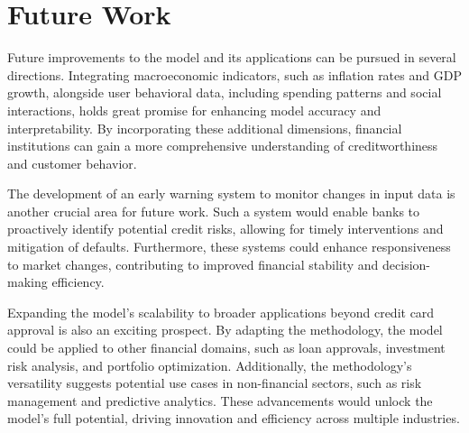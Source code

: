 \documentclass[12pt]{report}
\begin{document}
    \section{Future Work}
    Future improvements to the model and its applications can be pursued in several directions. Integrating macroeconomic indicators, such as inflation rates and GDP growth, alongside user behavioral data, including spending patterns and social interactions, holds great promise for enhancing model accuracy and interpretability. By incorporating these additional dimensions, financial institutions can gain a more comprehensive understanding of creditworthiness and customer behavior.
    
    The development of an early warning system to monitor changes in input data is another crucial area for future work. Such a system would enable banks to proactively identify potential credit risks, allowing for timely interventions and mitigation of defaults. Furthermore, these systems could enhance responsiveness to market changes, contributing to improved financial stability and decision-making efficiency.
    
    Expanding the model’s scalability to broader applications beyond credit card approval is also an exciting prospect. By adapting the methodology, the model could be applied to other financial domains, such as loan approvals, investment risk analysis, and portfolio optimization. Additionally, the methodology’s versatility suggests potential use cases in non-financial sectors, such as risk management and predictive analytics. These advancements would unlock the model’s full potential, driving innovation and efficiency across multiple industries.

    
    
\end{document}
